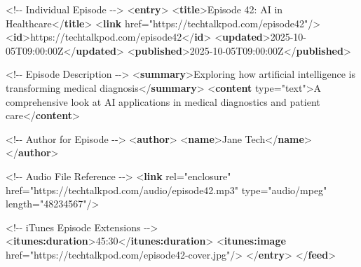 \documentclass[
  letterpaper,
  DIV=11,
  numbers=noendperiod]{scrartcl}
\newenvironment{Shaded}{\begin{snugshade}}{\end{snugshade}}
\newcommand{\CommentTok}[1]{\textcolor[rgb]{0.37,0.37,0.37}{#1}}
\newcommand{\KeywordTok}[1]{\textcolor[rgb]{0.00,0.23,0.31}{\textbf{#1}}}
\newcommand{\NormalTok}[1]{\textcolor[rgb]{0.00,0.23,0.31}{#1}}
\newcommand{\OtherTok}[1]{\textcolor[rgb]{0.00,0.23,0.31}{#1}}
\newcommand{\StringTok}[1]{\textcolor[rgb]{0.13,0.47,0.30}{#1}}
\begin{document}
\begin{Shaded}
\begin{Highlighting}[]
  \CommentTok{\textless{}!{-}{-} Individual Episode {-}{-}\textgreater{}}
\NormalTok{  \textless{}}\KeywordTok{entry}\NormalTok{\textgreater{}}
\NormalTok{    \textless{}}\KeywordTok{title}\NormalTok{\textgreater{}Episode 42: AI in Healthcare\textless{}/}\KeywordTok{title}\NormalTok{\textgreater{}}
\NormalTok{    \textless{}}\KeywordTok{link}\OtherTok{ href=}\StringTok{"https://techtalkpod.com/episode42"}\NormalTok{/\textgreater{}}
\NormalTok{    \textless{}}\KeywordTok{id}\NormalTok{\textgreater{}https://techtalkpod.com/episode42\textless{}/}\KeywordTok{id}\NormalTok{\textgreater{}}
\NormalTok{    \textless{}}\KeywordTok{updated}\NormalTok{\textgreater{}2025{-}10{-}05T09:00:00Z\textless{}/}\KeywordTok{updated}\NormalTok{\textgreater{}}
\NormalTok{    \textless{}}\KeywordTok{published}\NormalTok{\textgreater{}2025{-}10{-}05T09:00:00Z\textless{}/}\KeywordTok{published}\NormalTok{\textgreater{}}
    
    \CommentTok{\textless{}!{-}{-} Episode Description {-}{-}\textgreater{}}
\NormalTok{    \textless{}}\KeywordTok{summary}\NormalTok{\textgreater{}Exploring how artificial intelligence is transforming medical diagnosis\textless{}/}\KeywordTok{summary}\NormalTok{\textgreater{}}
\NormalTok{    \textless{}}\KeywordTok{content}\OtherTok{ type=}\StringTok{"text"}\NormalTok{\textgreater{}A comprehensive look at AI applications in medical diagnostics and patient care\textless{}/}\KeywordTok{content}\NormalTok{\textgreater{}}
    
    \CommentTok{\textless{}!{-}{-} Author for Episode {-}{-}\textgreater{}}
\NormalTok{    \textless{}}\KeywordTok{author}\NormalTok{\textgreater{}}
\NormalTok{      \textless{}}\KeywordTok{name}\NormalTok{\textgreater{}Jane Tech\textless{}/}\KeywordTok{name}\NormalTok{\textgreater{}}
\NormalTok{    \textless{}/}\KeywordTok{author}\NormalTok{\textgreater{}}
    
    \CommentTok{\textless{}!{-}{-} Audio File Reference {-}{-}\textgreater{}}
\NormalTok{    \textless{}}\KeywordTok{link}\OtherTok{ rel=}\StringTok{"enclosure"} 
\OtherTok{          href=}\StringTok{"https://techtalkpod.com/audio/episode42.mp3"} 
\OtherTok{          type=}\StringTok{"audio/mpeg"} 
\OtherTok{          length=}\StringTok{"48234567"}\NormalTok{/\textgreater{}}
    
    \CommentTok{\textless{}!{-}{-} iTunes Episode Extensions {-}{-}\textgreater{}}
\NormalTok{    \textless{}}\KeywordTok{itunes:duration}\NormalTok{\textgreater{}45:30\textless{}/}\KeywordTok{itunes:duration}\NormalTok{\textgreater{}}
\NormalTok{    \textless{}}\KeywordTok{itunes:image}\OtherTok{ href=}\StringTok{"https://techtalkpod.com/episode42{-}cover.jpg"}\NormalTok{/\textgreater{}}
\NormalTok{  \textless{}/}\KeywordTok{entry}\NormalTok{\textgreater{}}
\NormalTok{\textless{}/}\KeywordTok{feed}\NormalTok{\textgreater{}}
\end{Highlighting}
\end{Shaded}
\end{document}
